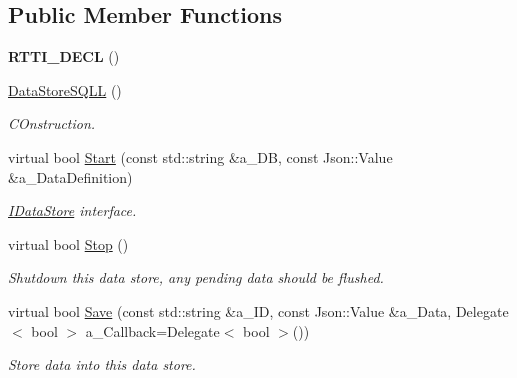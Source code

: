 \subsection*{Public Member Functions}
\begin{DoxyCompactItemize}
\item 
\mbox{\label{class_data_store_s_q_l_l_ad362cb6a735634589de18259bc767316}} 
{\bfseries R\+T\+T\+I\+\_\+\+D\+E\+CL} ()
\item 
\mbox{\label{class_data_store_s_q_l_l_ab31e3a263ca49fe6761ec63760e15809}} 
\hyperlink{class_data_store_s_q_l_l_ab31e3a263ca49fe6761ec63760e15809}{Data\+Store\+S\+Q\+LL} ()
\begin{DoxyCompactList}\small\item\em C\+Onstruction. \end{DoxyCompactList}\item 
\mbox{\label{class_data_store_s_q_l_l_a2cd1693fa646f2aaf9a0d083263fc567}} 
virtual bool \hyperlink{class_data_store_s_q_l_l_a2cd1693fa646f2aaf9a0d083263fc567}{Start} (const std\+::string \&a\+\_\+\+DB, const Json\+::\+Value \&a\+\_\+\+Data\+Definition)
\begin{DoxyCompactList}\small\item\em \hyperlink{class_i_data_store}{I\+Data\+Store} interface. \end{DoxyCompactList}\item 
\mbox{\label{class_data_store_s_q_l_l_ae31fe0b15e58cb23ae928267ef3e72ad}} 
virtual bool \hyperlink{class_data_store_s_q_l_l_ae31fe0b15e58cb23ae928267ef3e72ad}{Stop} ()
\begin{DoxyCompactList}\small\item\em Shutdown this data store, any pending data should be flushed. \end{DoxyCompactList}\item 
\mbox{\label{class_data_store_s_q_l_l_aa7f301e01cd51702d395064c3ec8a9f3}} 
virtual bool \hyperlink{class_data_store_s_q_l_l_aa7f301e01cd51702d395064c3ec8a9f3}{Save} (const std\+::string \&a\+\_\+\+ID, const Json\+::\+Value \&a\+\_\+\+Data, Delegate$<$ bool $>$ a\+\_\+\+Callback=Delegate$<$ bool $>$())
\begin{DoxyCompactList}\small\item\em Store data into this data store. \end{DoxyCompactList}\item 

\end{DoxyCompactItemize}
